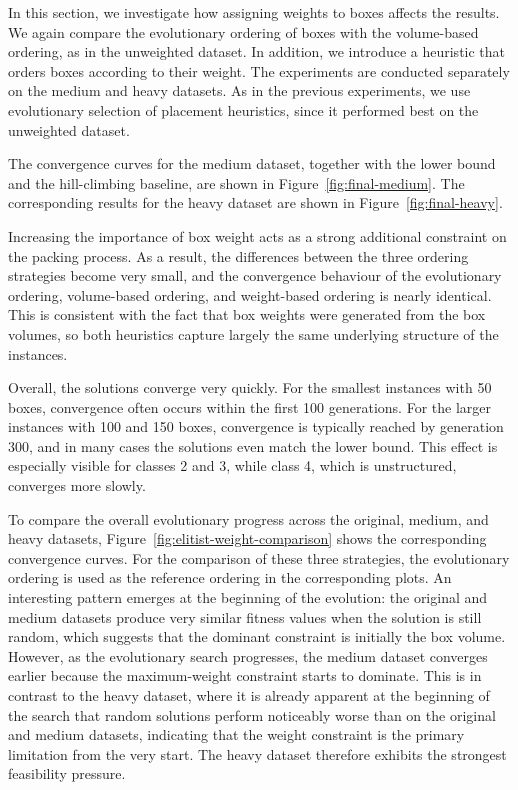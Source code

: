In this section, we investigate how assigning weights to boxes affects the results. 
We again compare the evolutionary ordering of boxes with the volume-based ordering, as in the unweighted dataset. 
In addition, we introduce a heuristic that orders boxes according to their weight.
The experiments are conducted separately on the medium and heavy datasets. 
As in the previous experiments, we use evolutionary selection of placement heuristics, since it performed best on the unweighted dataset.

The convergence curves for the medium dataset, together with the lower bound and the hill-climbing baseline, are shown in Figure~\ref{fig:final-medium}. 
The corresponding results for the heavy dataset are shown in Figure~\ref{fig:final-heavy}. 

Increasing the importance of box weight acts as a strong additional constraint on the packing process. 
As a result, the differences between the three ordering strategies become very small, and the convergence behaviour of the evolutionary ordering, volume-based ordering, and weight-based ordering is nearly identical. 
This is consistent with the fact that box weights were generated from the box volumes, so both heuristics capture largely the same underlying structure of the instances. 
 
Overall, the solutions converge very quickly. 
For the smallest instances with 50 boxes, convergence often occurs within the first 100 generations. 
For the larger instances with 100 and 150 boxes, convergence is typically reached by generation 300, and in many cases the solutions even match the lower bound. 
This effect is especially visible for classes 2 and 3, while class 4, which is unstructured, converges more slowly. 

To compare the overall evolutionary progress across the original, medium, and heavy datasets, Figure~\ref{fig:elitist-weight-comparison} shows the corresponding convergence curves. 
For the comparison of these three strategies, the evolutionary ordering is used as the reference ordering in the corresponding plots. 
An interesting pattern emerges at the beginning of the evolution: the original and medium datasets produce very similar fitness values when the solution is still random, which suggests that the dominant constraint is initially the box volume. 
However, as the evolutionary search progresses, the medium dataset converges earlier because the maximum-weight constraint starts to dominate. 
This is in contrast to the heavy dataset, where it is already apparent at the beginning of the search that random solutions perform noticeably worse than on the original and medium datasets, indicating that the weight constraint is the primary limitation from the very start. 
The heavy dataset therefore exhibits the strongest feasibility pressure. 

